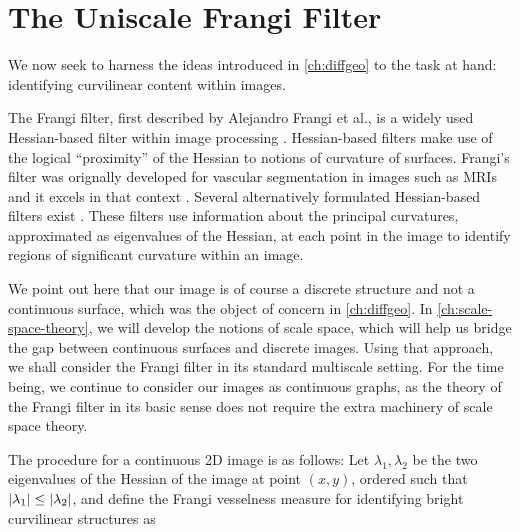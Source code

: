 \chapter{The Uniscale Frangi Filter} \label{ch:unifrangi}

	We now seek to harness the ideas introduced in \cref{ch:diffgeo} to the task at hand: identifying curvilinear content within images.

The Frangi filter, first described by Alejandro Frangi et al., is a widely used  Hessian-based filter
within image processing \cite{frangi-paper}. Hessian-based filters make use of the
logical ``proximity'' of the Hessian to notions of curvature of surfaces. Frangi's filter was orignally developed for vascular segmentation in images such as MRIs and it excels in that context \cite{frangi-paper}.
Several alternatively formulated Hessian-based filters exist \cite{sato-filter,lorenz-filter,olabarriaga-hessian-comparison}. These filters use information about the principal curvatures, approximated as eigenvalues of the Hessian, at each point in the image
to identify regions of significant curvature within an image.

We point out here that our image is of course a discrete structure and not a continuous surface, which was the object of concern in \cref{ch:diffgeo}.
In \cref{ch:scale-space-theory}, we will develop the notions of scale space, which will help us bridge the gap between continuous surfaces and discrete images. Using that approach, we shall consider the Frangi filter in its standard multiscale setting. For the time being, we continue to consider our images as continuous graphs, as the theory of the Frangi filter in its basic sense does not require the extra machinery of scale space theory.


The procedure for a continuous 2D image is as follows:
Let $\lambda_1, \lambda_2$ be the two eigenvalues of the Hessian of the image at point $(x, y)$,
ordered such that $\vert\lambda_1\vert \leq \vert\lambda_2\vert$, and define the Frangi vesselness measure for identifying bright curvilinear structures as %

